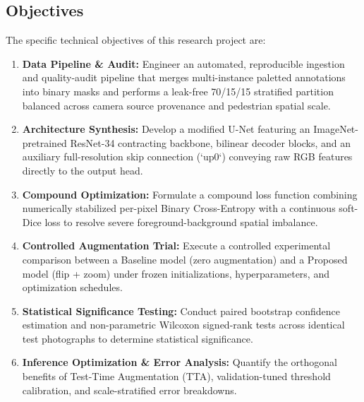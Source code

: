 \documentclass[10pt,a4paper]{article}
\begin{document}
\subsection{Objectives}
The specific technical objectives of this research project are:
\begin{enumerate}
    \item \textbf{Data Pipeline \& Audit:} Engineer an automated, reproducible ingestion and quality-audit pipeline that merges multi-instance paletted annotations into binary masks and performs a leak-free 70/15/15 stratified partition balanced across camera source provenance and pedestrian spatial scale.
    \item \textbf{Architecture Synthesis:} Develop a modified U-Net featuring an ImageNet-pretrained ResNet-34 contracting backbone, bilinear decoder blocks, and an auxiliary full-resolution skip connection (`up0`) conveying raw RGB features directly to the output head.
    \item \textbf{Compound Optimization:} Formulate a compound loss function combining numerically stabilized per-pixel Binary Cross-Entropy with a continuous soft-Dice loss to resolve severe foreground-background spatial imbalance.
    \item \textbf{Controlled Augmentation Trial:} Execute a controlled experimental comparison between a Baseline model (zero augmentation) and a Proposed model (flip + zoom) under frozen initializations, hyperparameters, and optimization schedules.
    \item \textbf{Statistical Significance Testing:} Conduct paired bootstrap confidence estimation and non-parametric Wilcoxon signed-rank tests across identical test photographs to determine statistical significance.
    \item \textbf{Inference Optimization \& Error Analysis:} Quantify the orthogonal benefits of Test-Time Augmentation (TTA), validation-tuned threshold calibration, and scale-stratified error breakdowns.
\end{enumerate}
\end{document}
